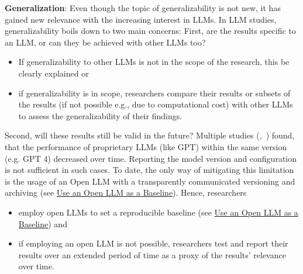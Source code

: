 \textbf{Generalization}:
Even though the topic of generalizability is not new, it has gained new relevance with the increasing interest in LLMs. In LLM studies, generalizability boils down to two main concerns:
First, are the results specific to an LLM, or can they be achieved with other LLMs too? 
\begin{itemize}
  \item If generalizability to other LLMs is not in the scope of the research, this \must be clearly explained or
  \item if generalizability is in scope, researchers \must compare their results or subsets of the results (if not possible e.g., due to computational cost) with other LLMs to assess the generalizability of their findings. 
\end{itemize}
Second, will these results still be valid in the future? Multiple studies (\cite{DBLP:journals/corr/abs-2307-09009},~\cite{doi:10.1148/radiol.232411}) found, that the performance of proprietary LLMs (like GPT) within the same version (e.g. GPT 4) decreased over time. Reporting the model version and configuration is not sufficient in such cases. To date, the only way of mitigating this limitation is the usage of an Open LLM with a transparently communicated versioning and archiving (see \href{/guidelines/#use-open-llm}{Use an Open LLM as a Baseline}). Hence, researchers
\begin{itemize}
  \item \should employ open LLMs to set a reproducible baseline (see \href{/guidelines/#use-open-llm}{Use an Open LLM as a Baseline}) and
  \item if employing an open LLM is not possible, researchers \should test and report their results over an extended period of time as a proxy of the results' relevance over time.
\end{itemize}

